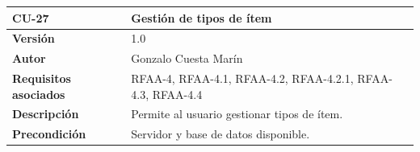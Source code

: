 \documentclass[
]{article}
\begin{document}
\begin{longtable}[]{@{}ll@{}}
\toprule
\begin{minipage}[b]{0.19\columnwidth}\raggedright
\textbf{CU-27}\strut
\end{minipage} & \begin{minipage}[b]{0.75\columnwidth}\raggedright
\textbf{Gestión de tipos de ítem}\strut
\end{minipage}\tabularnewline
\midrule
\endhead
\begin{minipage}[t]{0.19\columnwidth}\raggedright
\textbf{Versión}\strut
\end{minipage} & \begin{minipage}[t]{0.75\columnwidth}\raggedright
1.0\strut
\end{minipage}\tabularnewline
\begin{minipage}[t]{0.19\columnwidth}\raggedright
\textbf{Autor}\strut
\end{minipage} & \begin{minipage}[t]{0.75\columnwidth}\raggedright
Gonzalo Cuesta Marín\strut
\end{minipage}\tabularnewline
\begin{minipage}[t]{0.19\columnwidth}\raggedright
\textbf{Requisitos asociados}\strut
\end{minipage} & \begin{minipage}[t]{0.75\columnwidth}\raggedright
RFAA-4, RFAA-4.1, RFAA-4.2, RFAA-4.2.1, RFAA-4.3, RFAA-4.4\strut
\end{minipage}\tabularnewline
\begin{minipage}[t]{0.19\columnwidth}\raggedright
\textbf{Descripción}\strut
\end{minipage} & \begin{minipage}[t]{0.75\columnwidth}\raggedright
Permite al usuario gestionar tipos de ítem.\strut
\end{minipage}\tabularnewline
\begin{minipage}[t]{0.19\columnwidth}\raggedright
\textbf{Precondición}\strut
\end{minipage} & \begin{minipage}[t]{0.75\columnwidth}\raggedright
Servidor y base de datos disponible.


\end{minipage}
\end{longtable}
\end{document}
